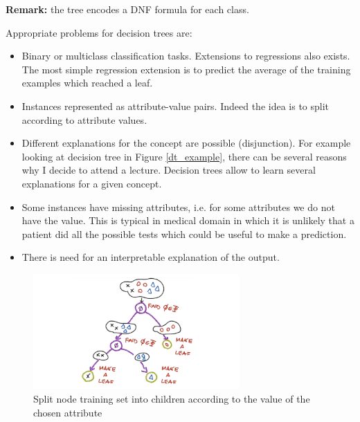 \textbf{Remark:} the tree encodes a DNF formula for each class.
\newline

Appropriate problems for decision trees are:
\begin{itemize}
	\item Binary or multiclass classification tasks. Extensions to regressions
		also exists. The most simple regression extension is to predict the average of
		the training examples which reached a leaf.

	\item Instances represented as attribute-value pairs. Indeed the idea is to
		split according to attribute values.

	\item Different explanations for the concept are possible (disjunction). For
		example looking at decision tree in Figure \ref{dt_example}, there can be several
		reasons why I decide to attend a lecture. Decision trees allow to learn
		several explanations for a given concept.

	\item Some instances have missing attributes, i.e. for some attributes we do not
		have the value. This is typical in medical domain in which it is unlikely
		that a patient did all the possible tests which could be useful to make a
		prediction.

	\item There is need for an interpretable explanation of the output.
\end{itemize}

\begin{figure}[H]
	\centering
	\includegraphics[width=0.7\textwidth]{
		images/02_DecisionTrees_decisionTree2.png
	}
	\caption{Split node training set into children according to the value of the
	chosen attribute}
	\label{ricci_dt}
\end{figure}

